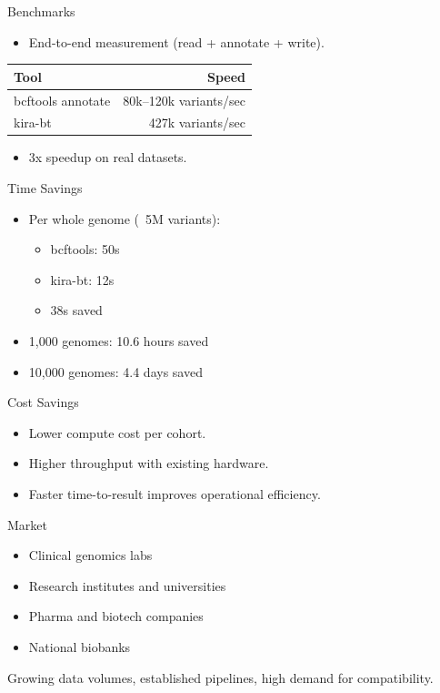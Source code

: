 \documentclass[aspectratio=169]{beamer}
\begin{document}
\begin{frame}{Benchmarks}
\begin{itemize}
  \item End-to-end measurement (read + annotate + write).
\end{itemize}
\vspace{0.5em}
\begin{tabular}{l r}
  \textbf{Tool} & \textbf{Speed} \\\hline
  bcftools annotate & 80k--120k variants/sec \\
  kira-bt & 427k variants/sec \\
\end{tabular}
\vspace{0.5em}
\begin{itemize}
  \item 3x speedup on real datasets.
\end{itemize}
\end{frame}

\begin{frame}{Time Savings}
\begin{itemize}
  \item Per whole genome (~5M variants):
  \begin{itemize}
    \item bcftools: 50s
    \item kira-bt: 12s
    \item 38s saved
  \end{itemize}
  \item 1,000 genomes: 10.6 hours saved
  \item 10,000 genomes: 4.4 days saved
\end{itemize}
\end{frame}

\begin{frame}{Cost Savings}
\begin{itemize}
  \item Lower compute cost per cohort.
  \item Higher throughput with existing hardware.
  \item Faster time-to-result improves operational efficiency.
\end{itemize}
\end{frame}

\begin{frame}{Market}
\begin{itemize}
  \item Clinical genomics labs
  \item Research institutes and universities
  \item Pharma and biotech companies
  \item National biobanks
\end{itemize}
\vspace{0.5em}
Growing data volumes, established pipelines, high demand for compatibility.
\end{frame}
\end{document}
